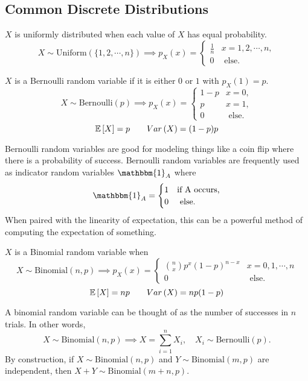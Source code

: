 \subsection{Common Discrete Distributions}
\begin{definition}
  $X$ is uniformly distributed when each value of $X$ has equal probability.
  \[
	X\sim \text{Uniform}(\{ 1, 2, \cdots, n \}) \implies p_X(x)  = \begin{cases}
	  \frac{1}{n} & x = 1, 2, \cdots, n,\\
	  0 & \text{ else.}
	\end{cases}
  \]
  \label{defn:drv-uniform}
\end{definition}
\begin{definition}
  $X$ is a Bernoulli random variable if it is either $0$ or $1$ with $p_X(1) = p$.
  \[
	X\sim\text{Bernoulli}(p) \implies p_X(x) = \begin{cases}
	  1 - p & x=0,\\
	  p & x=1,\\
	  0 & \text{ else.}
	\end{cases}
  \]
  \[
	\mathbb{E}\left[X\right] = p \qquad Var\left(X\right) = (1-p)p
  \]
  \label{defn:bernoulli}
\end{definition}
Bernoulli random variables are good for modeling things like a coin flip where there is a probability of success.
Bernoulli random variables are frequently used as indicator random variables $\mathbbm{1}_A$ where
\[
  \mathbbm{1}_A = \begin{cases}
	1 & \text{if A occurs,}\\
	0 & \text{ else.}
  \end{cases}
\]
When paired with the linearity of expectation, this can be a powerful method of computing the expectation of something.
\begin{definition}
  $X$ is a Binomial random variable when
  \[
	X \sim \text{Binomial}(n, p) \implies p_X(x) = \begin{cases}
	\binom{n}{x} p^x (1-p)^{n-x} & x=0, 1, \cdots, n\\
	  0 & \text{ else.}
	\end{cases}
  \]
  \[
	\mathbb{E}\left[X\right] = np \qquad Var\left(X\right) = np(1-p)
  \]
  \label{defn:binomial}
\end{definition}
A binomial random variable can be thought of as the number of successes in $n$ trials. 
In other words, 
\[
  X \sim \text{Binomial}(n, p) \implies X = \sum_{i=1}^{n}X_i, \quad X_i \sim \text{Bernoulli}(p).
\]
By construction, if $X\sim\text{Binomial}(n, p)$ and $Y\sim\text{Binomial}(m, p)$ are independent, then $X+Y \sim \text{Binomial}(m+n, p)$.
